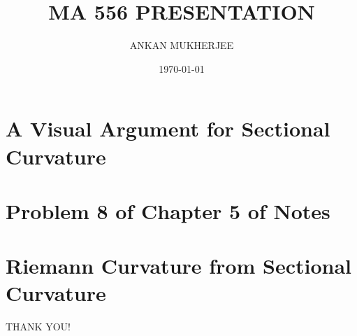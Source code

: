 \documentclass{beamer} %
\title{MA 556 PRESENTATION}
\author{ANKAN MUKHERJEE}
\institute{IIT BOMBAY}
\date{\today}
\begin{document}
\frame{\titlepage}

\section{A Visual Argument for Sectional Curvature}

\section{Problem 8 of Chapter 5 of Notes}

\section{Riemann Curvature from Sectional Curvature}





\begin{frame}
\begin{center}
THANK YOU!
\end{center}
\end{frame}


\end{document}
